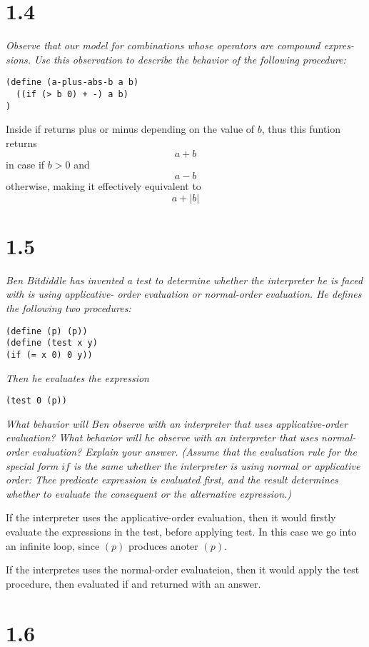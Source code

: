 \documentclass[11pt,oneside,titlepage]{book}
\begin{document}
\section*{1.4}

\textit{Observe that our model for combinations whose operators are compound expres-
sions. Use this observation to describe the behavior of the
following procedure:}

\begin{verbatim}
(define (a-plus-abs-b a b)
  ((if (> b 0) + -) a b)
)
\end{verbatim}

Inside if returns plus or minus depending on the value of $b$, thus this funtion returns
$$a + b$$
in case if $b > 0$
and
$$a - b$$
otherwise, making it effectively equivalent to
$$a + |b|$$

\section*{1.5}
\textit{ Ben Bitdiddle has invented a test to determine
whether the interpreter he is faced with is using applicative-
order evaluation or normal-order evaluation. He defines the
following two procedures:}
\begin{verbatim}
(define (p) (p))
(define (test x y)
(if (= x 0) 0 y))
\end{verbatim}
\textit{Then he evaluates the expression}
\begin{verbatim}
(test 0 (p))
\end{verbatim}
\textit{What behavior will Ben observe with an interpreter that
uses applicative-order evaluation? What behavior will he
observe with an interpreter that uses normal-order evaluation?
Explain your answer. (Assume that the evaluation
rule for the special form $if$ is the same whether the interpreter
is using normal or applicative order: Thee predicate
expression is evaluated first, and the result determines
whether to evaluate the consequent or the alternative expression.)
}

If the interpreter uses the applicative-order evaluation, then it would
firstly evaluate the expressions in the test, before applying test. In this case
we go into an infinite loop, since $(p)$ produces anoter $(p)$.

If the interpretes uses the normal-order evaluateion, then it would apply
the test procedure, then evaluated if and returned with an answer.

\section*{1.6}
\end{document}
